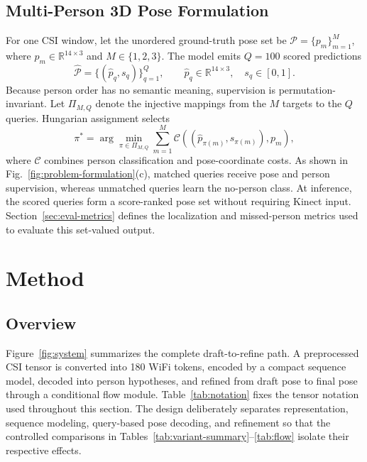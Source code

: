\documentclass[conference,onecolumn]{IEEEtran}
\begin{document}
\subsection{Multi-Person 3D Pose Formulation}
For one CSI window, let the unordered ground-truth pose set be $\mathcal P=\{p_m\}_{m=1}^{M}$, where $p_m\in\mathbb R^{14\times3}$ and $M\in\{1,2,3\}$. The model emits $Q=100$ scored predictions
\begin{equation}
    \hat{\mathcal P}=\{(\hat p_q,s_q)\}_{q=1}^{Q},
    \qquad \hat p_q\in\mathbb R^{14\times3},\quad s_q\in[0,1].
    \label{eq:predicted-pose-set}
\end{equation}
Because person order has no semantic meaning, supervision is permutation-invariant. Let $\Pi_{M,Q}$ denote the injective mappings from the $M$ targets to the $Q$ queries. Hungarian assignment selects
\begin{equation}
    \pi^{*}=\arg\min_{\pi\in\Pi_{M,Q}}
    \sum_{m=1}^{M}\mathcal C\!\left((\hat p_{\pi(m)},s_{\pi(m)}),p_m\right),
    \label{eq:hungarian-task}
\end{equation}
where $\mathcal C$ combines person classification and pose-coordinate costs. As shown in Fig.~\ref{fig:problem-formulation}(c), matched queries receive pose and person supervision, whereas unmatched queries learn the no-person class. At inference, the scored queries form a score-ranked pose set without requiring Kinect input. Section~\ref{sec:eval-metrics} defines the localization and missed-person metrics used to evaluate this set-valued output.

\FloatBarrier

\section{Method}
\label{sec:method}
\subsection{Overview}
Figure~\ref{fig:system} summarizes the complete draft-to-refine path. A preprocessed CSI tensor is converted into 180 WiFi tokens, encoded by a compact sequence model, decoded into person hypotheses, and refined from draft pose to final pose through a conditional flow module. Table~\ref{tab:notation} fixes the tensor notation used throughout this section. The design deliberately separates representation, sequence modeling, query-based pose decoding, and refinement so that the controlled comparisons in Tables~\ref{tab:variant-summary}--\ref{tab:flow} isolate their respective effects.
\end{document}
